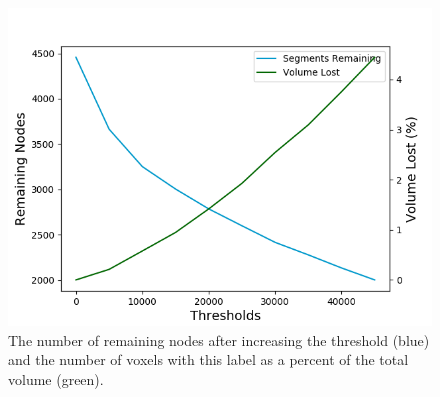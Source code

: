 \begin{figure}
	\begin{center}
		\includegraphics[width=0.95\linewidth]{./figures/node-threshold.png}
		\caption{The number of remaining nodes after increasing the threshold (blue) and the number of voxels with this label as a percent of the total volume (green). }
		\label{fig:node-pruning}
	\end{center}
\end{figure}
